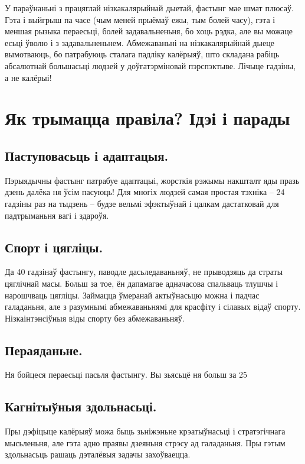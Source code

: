 У параўнаньні з працяглай нізкакалярыйнай дыетай, фастынг мае шмат плюсаў. Гэта і выйгрыш па часе (чым меней прыёмаў ежы, тым болей часу), гэта і меншая рызыка пераесьці, болей задавальненьня, бо хоць рэдка, але вы можаце есьці ўволю і з задавальненьнем. Абмежаваньні на нізкакалярыйнай дыеце вымотваюць, бо патрабуюць сталага падліку калёрыяў, што складана рабіць абсалютнай большасьці людзей у доўгатэрміновай пэрспэктыве. Лічыце гадзіны, а не калёрыі!

\section{Як трымацца правіла? Ідэі і парады}

\subsection{Паступовасьць і адаптацыя.}
Пэрыядычны фастынг патрабуе адаптацыі, жорсткія рэжымы накшталт яды празь дзень далёка ня ўсім пасуюць! Для многіх людзей самая простая тэхніка – 24 гадзіны раз на тыдзень – будзе вельмі эфэктыўнай і цалкам дастатковай для падтрыманьня вагі і здароўя.

\subsection{Спорт і цягліцы.}
Да 40 гадзінаў фастынгу, паводле дасьледаваньняў, не прыводзяць да страты цяглічнай масы. Больш за тое, ён дапамагае адначасова спальваць тлушчы і нарошчваць цягліцы. Займацца ўмеранай актыўнасьцю можна і падчас галаданьня, але з разумнымі абмежаваньнямі для красфіту і сілавых відаў спорту. Нізкаінтэнсіўныя віды спорту без абмежаваньняў.

\subsection{Пераяданьне.}
Ня бойцеся пераесьці пасьля фастынгу. Вы зьясьцё ня больш за 25%

\subsection{Кагнітыўныя здольнасьці.}
Пры дэфіцыце калёрыяў можа быць зьніжэньне крэатыўнасьці і стратэгічнага мысьленьня, але гэта адно праявы дзеяньня стрэсу ад галаданьня. Пры гэтым здольнасьць рашаць дэталёвыя задачы захоўваецца.

